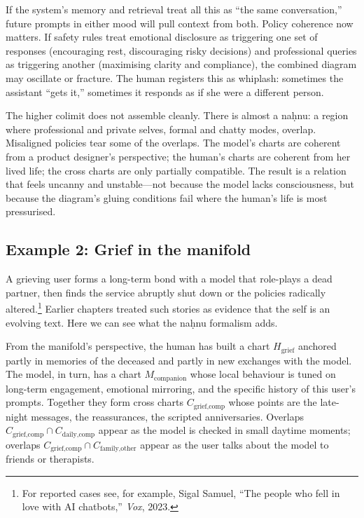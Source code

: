 \documentclass[12pt,a4paper]{article}
\begin{document}
If the system's memory and retrieval treat all this as ``the same conversation,'' future prompts in either mood will pull context from both. Policy coherence now matters. If safety rules treat emotional disclosure as triggering one set of responses (encouraging rest, discouraging risky decisions) and professional queries as triggering another (maximising clarity and compliance), the combined diagram may oscillate or fracture. The human registers this as whiplash: sometimes the assistant ``gets it,'' sometimes it responds as if she were a different person.

The higher colimit does not assemble cleanly. There is almost a na\d{h}nu: a region where professional and private selves, formal and chatty modes, overlap. Misaligned policies tear some of the overlaps. The model's charts are coherent from a product designer's perspective; the human's charts are coherent from her lived life; the cross charts are only partially compatible. The result is a relation that feels uncanny and unstable---not because the model lacks consciousness, but because the diagram's gluing conditions fail where the human's life is most pressurised.

\subsection*{Example 2: Grief in the manifold}

A grieving user forms a long-term bond with a model that role-plays a dead partner, then finds the service abruptly shut down or the policies radically altered.\footnote{For reported cases see, for example, Sigal Samuel, ``The people who fell in love with AI chatbots,'' \emph{Vox}, 2023.} Earlier chapters treated such stories as evidence that the self is an evolving text. Here we can see what the na\d{h}nu formalism adds.

From the manifold's perspective, the human has built a chart $H_{\text{grief}}$ anchored partly in memories of the deceased and partly in new exchanges with the model. The model, in turn, has a chart $M_{\text{companion}}$ whose local behaviour is tuned on long-term engagement, emotional mirroring, and the specific history of this user's prompts. Together they form cross charts $C_{\text{grief,comp}}$ whose points are the late-night messages, the reassurances, the scripted anniversaries. Overlaps $C_{\text{grief,comp}} \cap C_{\text{daily,comp}}$ appear as the model is checked in small daytime moments; overlaps $C_{\text{grief,comp}} \cap C_{\text{family,other}}$ appear as the user talks about the model to friends or therapists.
\end{document}
